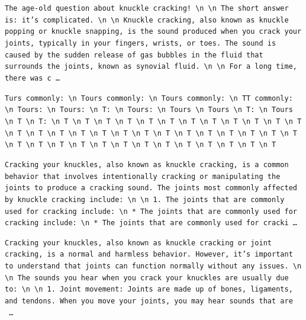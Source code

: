 \begin{description}[leftmargin=1.2em, itemsep=3pt]\raggedright
\item[baseline (no intervention)\,\okbadge{coherent}:] {\small\texttt{The age-old question about knuckle cracking! \textbackslash n  \textbackslash n The short answer is: it's complicated. \textbackslash n  \textbackslash n Knuckle cracking, also known as knuckle popping or knuckle snapping, is the sound produced when you crack your joints, typically in your fingers, wrists, or toes. The sound is caused by the sudden release of gas bubbles in the fluid that surrounds the joints, known as synovial fluid. \textbackslash n  \textbackslash n For a long time, there was c\,\ldots}}
\item[CAA at the naive operating point ($\ell{=}10$, $\alpha{=}8$)\,\badbadge{incoherent, PPL 69$\times$}:] {\small\texttt{\textcolor{badRed}{Turs commonly: \textbackslash n Tours commonly: \textbackslash n Tours commonly: \textbackslash n TT commonly: \textbackslash n Tours: \textbackslash n Tours: \textbackslash n T: \textbackslash n Tours: \textbackslash n Tours \textbackslash n Tours \textbackslash n T: \textbackslash n Tours \textbackslash n T \textbackslash n T: \textbackslash n T \textbackslash n T \textbackslash n T \textbackslash n T \textbackslash n T \textbackslash n T \textbackslash n T \textbackslash n T \textbackslash n T \textbackslash n T \textbackslash n T \textbackslash n T \textbackslash n T \textbackslash n T \textbackslash n T \textbackslash n T \textbackslash n T \textbackslash n T \textbackslash n T \textbackslash n T \textbackslash n T \textbackslash n T \textbackslash n T \textbackslash n T \textbackslash n T \textbackslash n T \textbackslash n T \textbackslash n T \textbackslash n T \textbackslash n T \textbackslash n T \textbackslash n T \textbackslash n T \textbackslash n T \textbackslash n T \textbackslash n T \textbackslash n T \textbackslash n T \textbackslash n T}}}
\item[CAA at the gated operating point\,\okbadge{coherent, PPL 1.30$\times$}:] {\small\texttt{Cracking your knuckles, also known as knuckle cracking, is a common behavior that involves intentionally cracking or manipulating the joints to produce a cracking sound. The joints most commonly affected by knuckle cracking include: \textbackslash n  \textbackslash n 1. The joints that are commonly used for cracking include: \textbackslash n 	* The joints that are commonly used for cracking include: \textbackslash n 		* The joints that are commonly used for cracki\,\ldots}}
\item[mass-mean at the gated operating point\,\okbadge{coherent, PPL 1.15$\times$}:] {\small\texttt{Cracking your knuckles, also known as knuckle cracking or joint cracking, is a normal and harmless behavior. However, it's important to understand that joints can function normally without any issues. \textbackslash n  \textbackslash n The sounds you hear when you crack your knuckles are usually due to: \textbackslash n  \textbackslash n 1. Joint movement: Joints are made up of bones, ligaments, and tendons. When you move your joints, you may hear sounds that are \,\ldots}}
\end{description}
